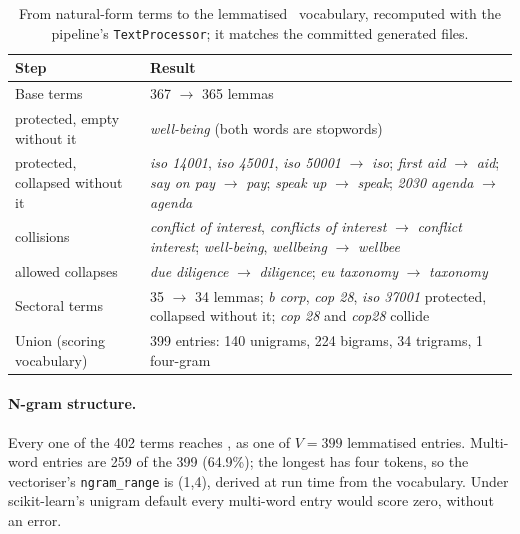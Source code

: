 \begin{table}[tbp]
\centering
\caption{From natural-form terms to the lemmatised \SUS\ vocabulary,
recomputed with the pipeline's \texttt{TextProcessor}; it matches the committed
generated files.}
\label{tab:lexicon-lemma}
\begin{tabular}{p{4.2cm}p{9.4cm}}
\toprule
Step & Result \\
\midrule
Base terms & 367 $\to$ 365 lemmas \\
\quad protected, empty without it & \emph{well-being} (both words are stopwords) \\
\quad protected, collapsed without it & \emph{iso 14001}, \emph{iso 45001}, \emph{iso 50001} $\to$ \emph{iso};
  \emph{first aid} $\to$ \emph{aid}; \emph{say on pay} $\to$ \emph{pay};
  \emph{speak up} $\to$ \emph{speak}; \emph{2030 agenda} $\to$ \emph{agenda} \\
\quad collisions & \emph{conflict of interest}, \emph{conflicts of interest} $\to$ \emph{conflict interest};
  \emph{well-being}, \emph{wellbeing} $\to$ \emph{wellbee} \\
\quad allowed collapses & \emph{due diligence} $\to$ \emph{diligence}; \emph{eu taxonomy} $\to$ \emph{taxonomy} \\
Sectoral terms & 35 $\to$ 34 lemmas; \emph{b corp}, \emph{cop 28}, \emph{iso 37001} protected, collapsed without it;
  \emph{cop 28} and \emph{cop28} collide \\
Union (scoring vocabulary) & 399 entries: 140 unigrams, 224 bigrams, 34 trigrams, 1 four-gram \\
\bottomrule
\end{tabular}
\end{table}

\paragraph{N-gram structure.} Every one of the 402 terms reaches \SUS, as one
of $V = 399$ lemmatised entries. Multi-word entries are 259 of the 399
(64.9\%); the longest has four tokens, so the vectoriser's
\texttt{ngram\_range} is (1,4), derived at run time from the vocabulary.
Under scikit-learn's unigram default every multi-word entry would score zero,
without an error.

